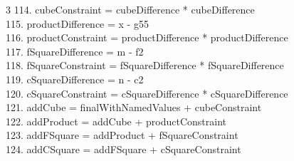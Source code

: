 \documentclass[10pt]{article}
\begin{document}
\begin{multicols}{3}
114. cubeConstraint = cubeDifference * cubeDifference\\
115. productDifference = x - g55\\
116. productConstraint = productDifference * productDifference\\
117. fSquareDifference = m - f2\\
118. fSquareConstraint = fSquareDifference * fSquareDifference\\
119. cSquareDifference = n - c2\\
120. cSquareConstraint = cSquareDifference * cSquareDifference\\
121. addCube = finalWithNamedValues + cubeConstraint\\
122. addProduct = addCube + productConstraint\\
123. addFSquare = addProduct + fSquareConstraint\\
124. addCSquare = addFSquare + cSquareConstraint\\
\end{multicols}
\end{document}
